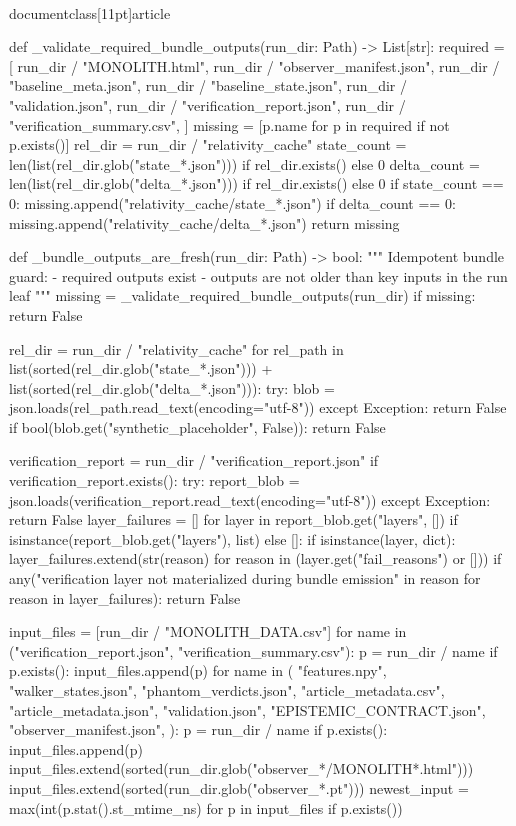 \\documentclass[11pt]{article}
\begin{document}
\begin{CodeBlock}
def _validate_required_bundle_outputs(run_dir: Path) -> List[str]:
    required = [
        run_dir / "MONOLITH.html",
        run_dir / "observer_manifest.json",
        run_dir / "baseline_meta.json",
        run_dir / "baseline_state.json",
        run_dir / "validation.json",
        run_dir / "verification_report.json",
        run_dir / "verification_summary.csv",
    ]
    missing = [p.name for p in required if not p.exists()]
    rel_dir = run_dir / "relativity_cache"
    state_count = len(list(rel_dir.glob("state_*.json"))) if rel_dir.exists() else 0
    delta_count = len(list(rel_dir.glob("delta_*.json"))) if rel_dir.exists() else 0
    if state_count == 0:
        missing.append("relativity_cache/state_*.json")
    if delta_count == 0:
        missing.append("relativity_cache/delta_*.json")
    return missing


def _bundle_outputs_are_fresh(run_dir: Path) -> bool:
    """
    Idempotent bundle guard:
    - required outputs exist
    - outputs are not older than key inputs in the run leaf
    """
    missing = _validate_required_bundle_outputs(run_dir)
    if missing:
        return False

    rel_dir = run_dir / "relativity_cache"
    for rel_path in list(sorted(rel_dir.glob("state_*.json"))) + list(sorted(rel_dir.glob("delta_*.json"))):
        try:
            blob = json.loads(rel_path.read_text(encoding="utf-8"))
        except Exception:
            return False
        if bool(blob.get("synthetic_placeholder", False)):
            return False

    verification_report = run_dir / "verification_report.json"
    if verification_report.exists():
        try:
            report_blob = json.loads(verification_report.read_text(encoding="utf-8"))
        except Exception:
            return False
        layer_failures = []
        for layer in report_blob.get("layers", []) if isinstance(report_blob.get("layers"), list) else []:
            if isinstance(layer, dict):
                layer_failures.extend(str(reason) for reason in (layer.get("fail_reasons") or []))
        if any("verification layer not materialized during bundle emission" in reason for reason in layer_failures):
            return False

    input_files = [run_dir / "MONOLITH_DATA.csv"]
    for name in ("verification_report.json", "verification_summary.csv"):
        p = run_dir / name
        if p.exists():
            input_files.append(p)
    for name in (
        "features.npy",
        "walker_states.json",
        "phantom_verdicts.json",
        "article_metadata.csv",
        "article_metadata.json",
        "validation.json",
        "EPISTEMIC_CONTRACT.json",
        "observer_manifest.json",
    ):
        p = run_dir / name
        if p.exists():
            input_files.append(p)
    input_files.extend(sorted(run_dir.glob("observer_*/MONOLITH*.html")))
    input_files.extend(sorted(run_dir.glob("observer_*.pt")))
    newest_input = max(int(p.stat().st_mtime_ns) for p in input_files if p.exists())


\end{CodeBlock}
\end{document}
